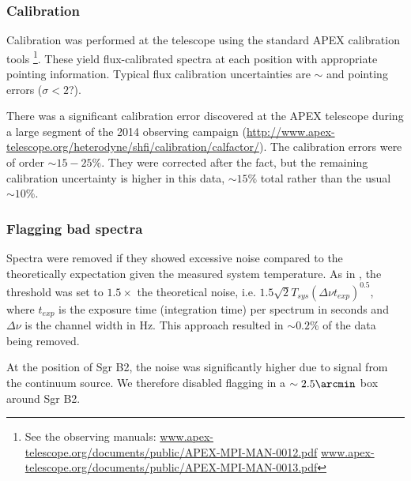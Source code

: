 \subsubsection{Calibration}
Calibration was performed at the telescope using the standard APEX calibration
tools
\footnote{See the observing manuals:
\url{www.apex-telescope.org/documents/public/APEX-MPI-MAN-0012.pdf}
\url{www.apex-telescope.org/documents/public/APEX-MPI-MAN-0013.pdf} }.
These yield flux-calibrated spectra at each position with appropriate pointing
information.  Typical flux calibration uncertainties are $\sim$  and
pointing errors  ($\sigma<2$\arcsec ?).

There was a significant calibration error discovered at the APEX telescope during
a large segment of the 2014 observing campaign
(\url{http://www.apex-telescope.org/heterodyne/shfi/calibration/calfactor/}).
The calibration errors were of order $\sim15-25\%$.  They were corrected after
the fact, but the remaining calibration uncertainty
is higher in this data, $\sim15\%$ total rather than the usual $\sim10\%$.

\subsubsection{Flagging bad spectra}
Spectra were removed if they showed excessive noise compared to the
theoretically expectation given the measured system temperature.  As in
\citet{Ao2013a}, the threshold was set to $1.5\times$ the theoretical noise,
i.e. $1.5 \sqrt{2} T_{sys} (\Delta\nu t_{exp})^0.5$, where $t_{exp}$ is the
exposure time (integration time) per spectrum in seconds and $\Delta\nu$ is the
channel width in Hz.  This approach resulted in $\sim0.2\%$ of the data being
removed.  

At the position of Sgr B2, the noise was significantly higher due to signal
from the continuum source.  We therefore disabled flagging in a
$\sim2.5\arcmin$ box around Sgr B2.



